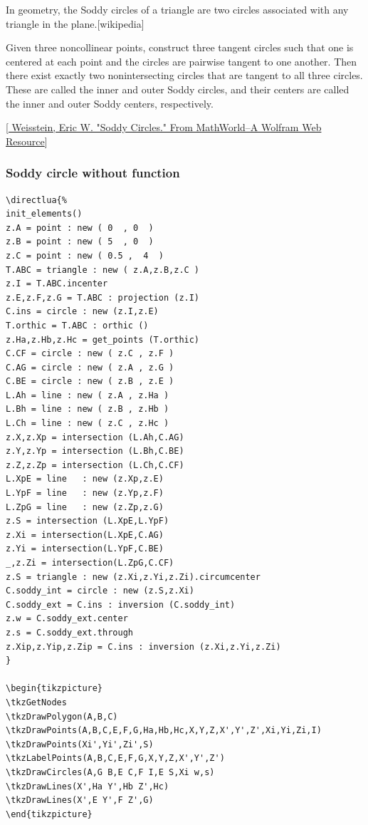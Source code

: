 In geometry, the Soddy circles of a triangle are two circles associated with any triangle in the plane.[wikipedia]

 Given three noncollinear points, construct three tangent circles such that one is centered at each point and the circles are pairwise tangent to one another. Then there exist exactly two nonintersecting circles that are tangent to all three circles. These are called the inner and outer Soddy circles, and their centers are called the inner and outer Soddy centers, respectively.

[\href{https://mathworld.wolfram.com/SoddyCircles.html}{ Weisstein, Eric W. "Soddy Circles." From MathWorld--A Wolfram Web Resource}]


\subsubsection{Soddy circle without function} %
\label{ssub:soddy}

\begin{Verbatim}
\directlua{%
init_elements()
z.A = point : new ( 0  , 0  )
z.B = point : new ( 5  , 0  )
z.C = point : new ( 0.5 ,  4  )
T.ABC = triangle : new ( z.A,z.B,z.C )
z.I = T.ABC.incenter
z.E,z.F,z.G = T.ABC : projection (z.I)
C.ins = circle : new (z.I,z.E)
T.orthic = T.ABC : orthic ()
z.Ha,z.Hb,z.Hc = get_points (T.orthic)
C.CF = circle : new ( z.C , z.F )
C.AG = circle : new ( z.A , z.G )
C.BE = circle : new ( z.B , z.E )
L.Ah = line : new ( z.A , z.Ha )
L.Bh = line : new ( z.B , z.Hb )
L.Ch = line : new ( z.C , z.Hc )
z.X,z.Xp = intersection (L.Ah,C.AG)
z.Y,z.Yp = intersection (L.Bh,C.BE)
z.Z,z.Zp = intersection (L.Ch,C.CF)
L.XpE = line   : new (z.Xp,z.E)
L.YpF = line   : new (z.Yp,z.F)
L.ZpG = line   : new (z.Zp,z.G)
z.S = intersection (L.XpE,L.YpF)
z.Xi = intersection(L.XpE,C.AG)
z.Yi = intersection(L.YpF,C.BE)
_,z.Zi = intersection(L.ZpG,C.CF)
z.S = triangle : new (z.Xi,z.Yi,z.Zi).circumcenter
C.soddy_int = circle : new (z.S,z.Xi)
C.soddy_ext = C.ins : inversion (C.soddy_int)
z.w = C.soddy_ext.center
z.s = C.soddy_ext.through
z.Xip,z.Yip,z.Zip = C.ins : inversion (z.Xi,z.Yi,z.Zi)
}

\begin{tikzpicture}
\tkzGetNodes
\tkzDrawPolygon(A,B,C)
\tkzDrawPoints(A,B,C,E,F,G,Ha,Hb,Hc,X,Y,Z,X',Y',Z',Xi,Yi,Zi,I)
\tkzDrawPoints(Xi',Yi',Zi',S)
\tkzLabelPoints(A,B,C,E,F,G,X,Y,Z,X',Y',Z')
\tkzDrawCircles(A,G B,E C,F I,E S,Xi w,s)
\tkzDrawLines(X',Ha Y',Hb Z',Hc)
\tkzDrawLines(X',E Y',F Z',G)
\end{tikzpicture}
\end{Verbatim}

